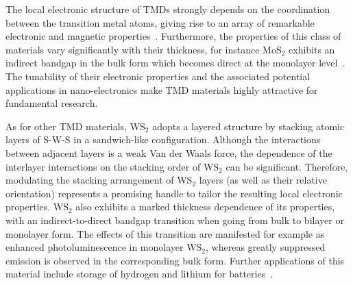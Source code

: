 The local electronic structure of TMDs strongly depends on the coordination 
between the transition metal atoms, giving rise to an array of remarkable electronic
and magnetic properties~\cite{Chhowalla:2013}.
%
Furthermore, the properties of this class of materials vary significantly
with their thickness, for instance MoS$_2$ exhibits an indirect bandgap
in the bulk form which becomes direct at the monolayer level~\cite{Splendiani:2010}.
%
The tunability of their electronic properties and the associated
potential applications in nano-electronics make TMD materials highly attractive for fundamental research. 

As for other TMD materials, WS$_2$ adopts a layered structure 
by stacking atomic layers of S-W-S in a sandwich-like configuration. 
%
Although the interactions between adjacent layers is a weak Van der Waals 
force, the dependence of the interlayer interactions on the stacking 
order of WS$_2$ can be significant.
%
Therefore, modulating the stacking arrangement of WS$_2$ layers (as well
as their relative orientation)
represents a promising handle to tailor the resulting local electronic properties.
%
WS$_2$ also exhibits a marked thickness dependence of
its properties, with an indirect-to-direct bandgap transition when going
from bulk to bilayer or monolayer form.
%
The effects of this transition are manifested for example as enhanced
photoluminescence in monolayer WS$_2$, whereas greatly suppressed emission is observed in
the corresponding bulk form.
%
Further applications of this material include storage of hydrogen 
and lithium for batteries~\cite{Bhandavat:2012}.

